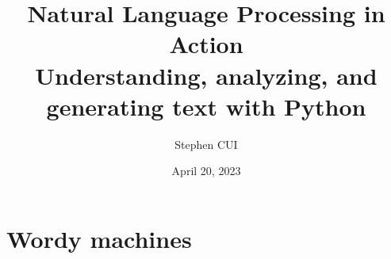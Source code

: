 \documentclass[openany]{book}
\title{\textbf{Natural Language Processing in Action}\\
Understanding, analyzing, and generating text with Python
}
\author{Stephen CUI}
\date{April 20, 2023}
\begin{document}
\maketitle
\part{Wordy machines}
% 

\end{document}
